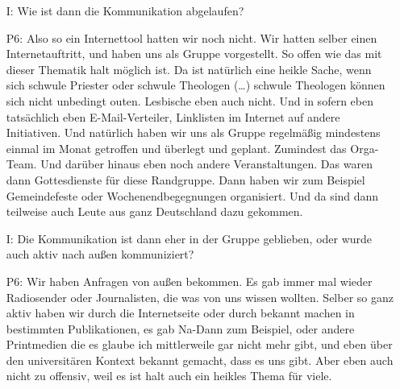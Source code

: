 \begin{itemize}
    \item[I:] Wie ist dann die Kommunikation abgelaufen?
    \item[P6:] Also so ein Internettool hatten wir noch nicht. Wir hatten selber einen Internetauftritt, und haben uns als Gruppe vorgestellt. So offen wie das mit dieser Thematik halt m{\"o}glich ist. Da ist nat{\"u}rlich eine heikle Sache, wenn sich schwule Priester oder schwule Theologen (\dots) schwule Theologen k{\"o}nnen sich nicht unbedingt outen. Lesbische eben auch nicht. Und in sofern eben tats{\"a}chlich eben E-Mail-Verteiler, Linklisten im Internet auf andere Initiativen. Und nat{\"u}rlich haben wir uns als Gruppe regelm{\"a}{\ss}ig mindestens einmal im Monat getroffen und {\"u}berlegt und geplant. Zumindest das Orga-Team. Und dar{\"u}ber hinaus eben noch andere Veranstaltungen. Das waren dann Gottesdienste f{\"u}r diese Randgruppe. Dann haben wir zum Beispiel Gemeindefeste oder Wochenendbegegnungen organisiert. Und da sind dann teilweise auch Leute aus ganz Deutschland dazu gekommen.
    \item[I:] Die Kommunikation ist dann eher in der Gruppe geblieben, oder wurde auch aktiv nach au{\ss}en kommuniziert?
    \item[P6:] Wir haben Anfragen von au{\ss}en bekommen. Es gab immer mal wieder Radiosender oder Journalisten, die was von uns wissen wollten. Selber so ganz aktiv haben wir durch die Internetseite oder durch bekannt machen in bestimmten Publikationen, es gab Na-Dann zum Beispiel, oder andere Printmedien die es glaube ich mittlerweile gar nicht mehr gibt, und eben {\"u}ber den universit{\"a}ren Kontext bekannt gemacht, dass es uns gibt. Aber eben auch nicht zu offensiv, weil es ist halt auch ein heikles Thema f{\"u}r viele.
\end{itemize}

